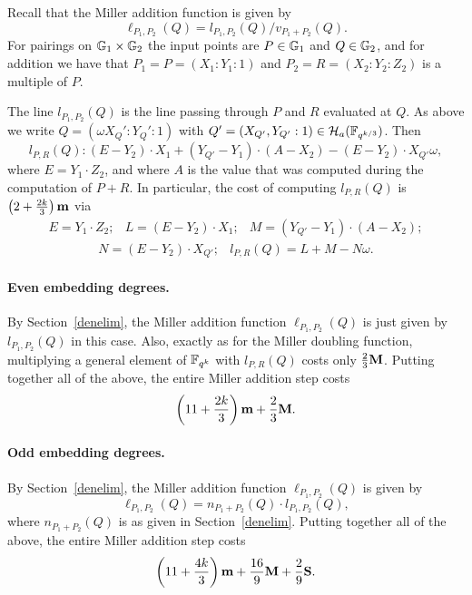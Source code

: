 Recall that the Miller addition function is given by
\[\ell_{P_1,P_2}(Q) = l_{P_1,P_2}(Q)/v_{P_1 + P_2}(Q).\]
For pairings on $\mathbb{G}_{1} \times \mathbb{G}_{2}$ the input points are $P \in \mathbb{G}_{1}$ and
$Q \in \mathbb{G}_{2}$, and for addition we have that
 $P_1  = P = (X_1:Y_1:1)$ and $P_2 = R = (X_2:Y_2:Z_2)$ is a multiple of $P$.
 
The line $l_{P_1,P_2}(Q)$ is the line passing through $P$ and $R$ evaluated at $Q$.
As above we write $Q = (\omega X_Q':Y_Q':1)$ with
$Q' = (X_{Q'},Y_{Q'}:1) \in \mathcal{H}_a(\mathbb{F}_{q^{k/3}})$.
Then
$$l_{P,R}(Q): (E - Y_2) \cdot X_1 + (Y_{Q'} - Y_1) \cdot (A - X_2) - (E - Y_2) \cdot X_{Q'}\omega,  $$
where $E = Y_1 \cdot Z_2$, and where $A$ is the value that was computed during the computation of $P+R$.
In particular, the cost of computing $l_{P,R}(Q)$ is $\left(2 + \frac{2k}{3}\right)\textbf{m}$ via
\[\begin{array}{ccc}
E = Y_1 \cdot Z_2; & L = (E-Y_2)\cdot X_1; 
& M = (Y_{Q'} - Y_1) \cdot (A - X_2); 
\end{array}\]
\[\begin{array}{cc}
N = (E - Y_2) \cdot X_{Q'}; &
l_{P,R}(Q) = L + M - N\omega.
\end{array}\]

\paragraph*{Even embedding degrees.}

By Section~\ref{denelim}, the Miller addition function $\ell_{P_1,P_2}(Q)$ is just given by $l_{P_1,P_2}(Q)$ in this case. 
Also, exactly as for the Miller doubling function, multiplying a general element of $\mathbb{F}_{q^k}$ with $l_{P,R}(Q)$ costs only
$\frac{2}{3}\textbf{M}$.
Putting together all of the above, the entire Miller addition step costs
\[\left(11 + \frac{2k}{3}\right)\textbf{m} + \frac{2}{3}\textbf{M}.\]

\paragraph*{Odd embedding degrees.}

By Section~\ref{denelim}, the Miller addition function $\ell_{P_1,P_2}(Q)$ is given by
\[\ell_{P_1,P_2}(Q) = n_{P_1+P_2}(Q) \cdot l_{P_1,P_2}(Q),\]
where $n_{P_1+P_2}(Q)$ is as given in Section~\ref{denelim}.
Putting together all of the above, the entire Miller addition step costs
$$\left(11 + \frac{4k}{3}\right)\textbf{m} + \frac{16}{9}\textbf{M} + \frac{2}{9}\textbf{S}.$$

